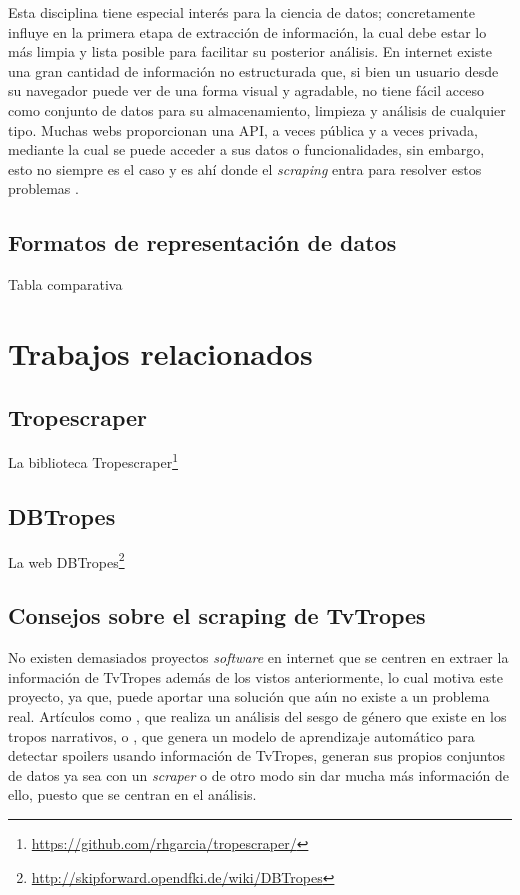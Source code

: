 Esta disciplina tiene especial interés para la ciencia de datos; concretamente
influye en la primera etapa de extracción de información, la cual debe estar lo
más limpia y lista posible para facilitar su posterior análisis. En internet
existe una gran cantidad de información no estructurada que, si bien un usuario
desde su navegador puede ver de una forma visual y agradable, no tiene fácil
acceso como conjunto de datos para su almacenamiento, limpieza y análisis de
cualquier tipo. Muchas webs proporcionan una API, a veces pública y a veces
privada, mediante la cual se puede acceder a sus datos o funcionalidades, sin
embargo, esto no siempre es el caso y es ahí donde el \textit{scraping} entra
para resolver estos problemas \cite{apress2018scraping}.

\cite{scraperworld, zhao2017web, olston2010web}

\subsection{Formatos de representación de datos}
Tabla comparativa
\section{Trabajos relacionados}
\subsection{Tropescraper}
La biblioteca
Tropescraper\footnote{\url{https://github.com/rhgarcia/tropescraper/}}
\cite{garcia2020startroper}

\subsection{DBTropes}
La web DBTropes\footnote{\url{http://skipforward.opendfki.de/wiki/DBTropes}}
\cite{kiesel2010dbtropes}

\subsection{Consejos sobre el scraping de TvTropes}
No existen demasiados proyectos \textit{software} en internet que se centren en
extraer la información de TvTropes además de los vistos anteriormente, lo cual
motiva este proyecto, ya que, puede aportar una solución que aún no existe a un
problema real. Artículos como \cite{gala2020analyzing}, que realiza un análisis
del sesgo de género que existe en los tropos narrativos, o
\cite{boyd2013spoiler}, que genera un modelo de aprendizaje automático para
detectar spoilers usando información de TvTropes, generan sus propios conjuntos
de datos ya sea con un \textit{scraper} o de otro modo sin dar mucha más
información de ello, puesto que se centran en el análisis. 

